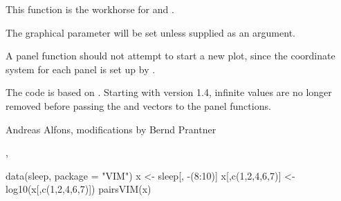 %
\begin{Details}\relax
This function is the workhorse for  and 
.

The graphical parameter  will be set unless supplied as an 
argument.

A panel function should not attempt to start a new plot, since the 
coordinate system for each panel is set up by .
\end{Details}
%
\begin{Note}\relax
The code is based on .  Starting with version 
1.4, infinite values are no longer removed before passing the  and 
 vectors to the panel functions.
\end{Note}
%
\begin{Author}\relax
Andreas Alfons, modifications by Bernd Prantner
\end{Author}
%
\begin{SeeAlso}\relax
{}, 
\end{SeeAlso}
%
\begin{Examples}
\begin{ExampleCode}
data(sleep, package = "VIM")
x <- sleep[, -(8:10)]
x[,c(1,2,4,6,7)] <- log10(x[,c(1,2,4,6,7)])
pairsVIM(x)
\end{ExampleCode}
\end{Examples}
